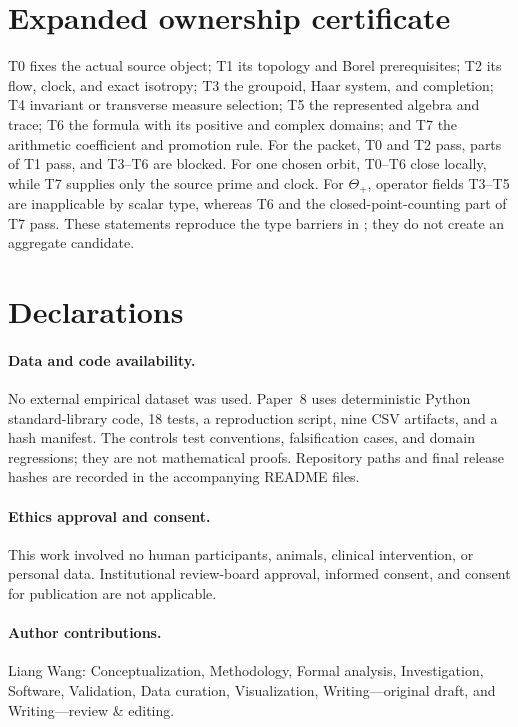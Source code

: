 \documentclass[11pt]{article}
\theoremstyle{definition}
\begin{document}
\section{Expanded ownership certificate}

T0 fixes the actual source object; T1 its topology and Borel prerequisites; T2 its flow, clock, and exact isotropy; T3 the groupoid, Haar system, and completion; T4 invariant or transverse measure selection; T5 the represented algebra and trace; T6 the formula with its positive and complex domains; and T7 the arithmetic coefficient and promotion rule.  For the packet, T0 and T2 pass, parts of T1 pass, and T3--T6 are blocked.  For one chosen orbit, T0--T6 close locally, while T7 supplies only the source prime and clock.  For \(\Theta_+\), operator fields T3--T5 are inapplicable by scalar type, whereas T6 and the closed-point-counting part of T7 pass.  These statements reproduce the type barriers in ; they do not create an aggregate candidate.

\section*{Declarations}

\paragraph{Data and code availability.}
No external empirical dataset was used.  Paper~8 uses deterministic Python standard-library code, 18 tests, a reproduction script, nine CSV artifacts, and a hash manifest.  The controls test conventions, falsification cases, and domain regressions; they are not mathematical proofs.  Repository paths and final release hashes are recorded in the accompanying README files.

\paragraph{Ethics approval and consent.}
This work involved no human participants, animals, clinical intervention, or personal data.  Institutional review-board approval, informed consent, and consent for publication are not applicable.

\paragraph{Author contributions.}
Liang Wang: Conceptualization, Methodology, Formal analysis, Investigation, Software, Validation, Data curation, Visualization, Writing---original draft, and Writing---review \& editing.
\end{document}
